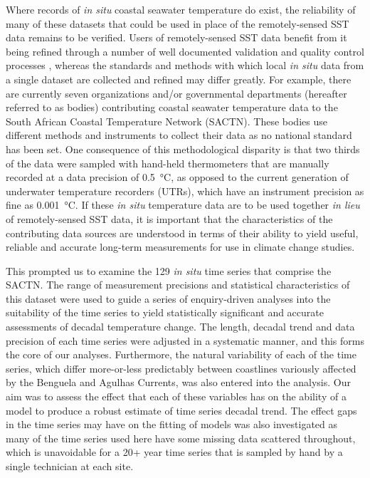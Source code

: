 \documentclass[twocol]{ametsoc}
\begin{document}
Where records of \emph{in situ} coastal seawater temperature do exist, the reliability of many of these datasets that could be used in place of the remotely-sensed SST data remains to be verified. Users of remotely-sensed SST data benefit from it being refined through a number of well documented validation and quality control processes \citep[\emph{e.g.}][]{Reynolds1994, Brown1999, Martin2012}, whereas the standards and methods with which local \emph{in situ} data from a single dataset are collected and refined may differ greatly. For example, there are currently seven organizations and/or governmental departments (hereafter referred to as bodies) contributing coastal seawater temperature data to the South African Coastal Temperature Network (SACTN). These bodies use different methods and instruments to collect their data as no national standard has been set. One consequence of this methodological disparity is that two thirds of the data were sampled with hand-held thermometers that are manually recorded at a data precision of \SI{0.5}{\degreeCelsius}, as opposed to the current generation of underwater temperature recorders (UTRs), which have an instrument precision as fine as \SI{0.001}{\degreeCelsius}. If these \emph{in situ} temperature data are to be used together \emph{in lieu} of remotely-sensed SST data, it is important that the characteristics of the contributing data sources are understood in terms of their ability to yield useful, reliable and accurate long-term measurements for use in climate change studies.

This prompted us to examine the 129 \emph{in situ} time series that comprise the SACTN. The range of measurement precisions and statistical characteristics of this dataset were used to guide a series of enquiry-driven analyses into the suitability of the time series to yield statistically significant and accurate assessments of decadal temperature change. The length, decadal trend and data precision of each time series were adjusted in a systematic manner, and this forms the core of our analyses. Furthermore, the natural variability of each of the time series, which differ more-or-less predictably between coastlines variously affected by the Benguela and Agulhas Currents, was also entered into the analysis. Our aim was to assess the effect that each of these variables has on the ability of a model to produce a robust estimate of time series decadal trend. The effect gaps in the time series may have on the fitting of models was also investigated as many of the time series used here have some missing data scattered throughout, which is unavoidable for a 20+ year time series that is sampled by hand by a single technician at each site.
\end{document}

